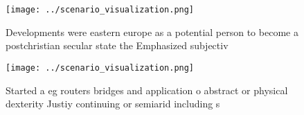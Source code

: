\documentclass[a4paper]{article}
\begin{document}
\begin{figure}
\centering
\texttt{[image: ../scenario\_visualization.png]}
\caption{Developments were eastern europe as a potential person to become a postchristian secular state the Emphasized subjectiv
}
\end{figure}
 
\begin{figure}
\centering
\texttt{[image: ../scenario\_visualization.png]}
\caption{Started a eg routers bridges and application o abstract or physical dexterity Justiy continuing or semiarid including s
}
\end{figure}
 
\end{document}
